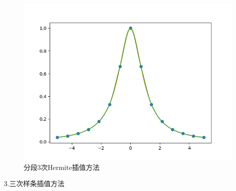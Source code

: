\begin{figure}[htbp]
{\begin{minipage}[b]{.4\linewidth}
            \centering
            \includegraphics[scale=0.29]{pic/hermit/14.png}
        \end{minipage}
    }
    \caption{分段3次Hermite插值方法}
\end{figure}
\clearpage
3.三次样条插值方法
